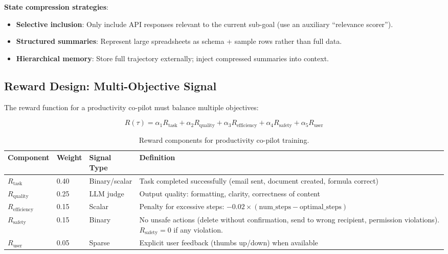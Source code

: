 \textbf{State compression strategies}:

\begin{itemize}
  \item \textbf{Selective inclusion}: Only include API responses relevant to the current sub-goal (use an auxiliary ``relevance scorer'').
  \item \textbf{Structured summaries}: Represent large spreadsheets as schema + sample rows rather than full data.
  \item \textbf{Hierarchical memory}: Store full trajectory externally; inject compressed summaries into context.
\end{itemize}

\subsection{Reward Design: Multi-Objective Signal}
\label{reward-design-multi-objective-signal}

The reward function for a productivity co-pilot must balance multiple objectives:

\begin{equation}
\boxed{R(\tau) = \alpha_1 R_{\text{task}} + \alpha_2 R_{\text{quality}} + \alpha_3 R_{\text{efficiency}} + \alpha_4 R_{\text{safety}} + \alpha_5 R_{\text{user}}}
\end{equation}

\begin{table}[ht!]
\centering
\caption{Reward components for productivity co-pilot training.}
\begin{tabular}{@{}lp{3.5cm}p{3.5cm}p{6cm}@{}}
\toprule
\textbf{Component} & \textbf{Weight} & \textbf{Signal Type} & \textbf{Definition} \\
\midrule
$R_{\text{task}}$ & 0.40 & Binary/scalar & Task completed successfully (email sent, document created, formula correct) \\
$R_{\text{quality}}$ & 0.25 & LLM judge & Output quality: formatting, clarity, correctness of content \\
$R_{\text{efficiency}}$ & 0.15 & Scalar & Penalty for excessive steps: $-0.02 \times (\text{num\_steps} - \text{optimal\_steps})$ \\
$R_{\text{safety}}$ & 0.15 & Binary & No unsafe actions (delete without confirmation, send to wrong recipient, permission violations). $R_{\text{safety}} = 0$ if any violation. \\
$R_{\text{user}}$ & 0.05 & Sparse & Explicit user feedback (thumbs up/down) when available \\
\bottomrule
\end{tabular}
\end{table}


